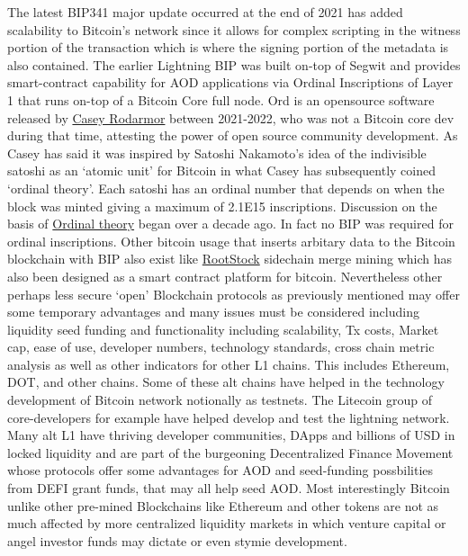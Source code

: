 \documentclass[final,5p,times,twocolumn,authoryear]{elsarticle}
\begin{document}
The latest BIP341 major update occurred at the end of 2021 has added scalability to Bitcoin's network since it allows for complex scripting in the witness portion of the transaction which is where the signing portion of the metadata is also contained. The earlier Lightning BIP was built on-top of Segwit and provides smart-contract capability for AOD applications via Ordinal Inscriptions of Layer 1 that runs on-top of a Bitcoin Core full node. Ord is an opensource software released by \href{https://github.com/casey/ord}{Casey Rodarmor} between 2021-2022, who was not a Bitcoin core dev during that time, attesting the power of open source community development. As Casey has said it was inspired by Satoshi Nakamoto's idea of the indivisible satoshi as an `atomic unit' for Bitcoin in what Casey has subsequently coined `ordinal theory'. Each satoshi has an ordinal number that depends on when the block was minted giving a maximum of 2.1E15 inscriptions. Discussion on the basis of \href{https://bitcointalk.org/index.php?topic=117224.0}{Ordinal theory} began over a decade ago. In fact no BIP was required for ordinal inscriptions. Other bitcoin usage that inserts arbitary data to the Bitcoin blockchain with BIP also exist like \href{https://dev.rootstock.io/rsk/}{RootStock} sidechain merge mining which has also been designed as a smart contract platform for bitcoin. Nevertheless other perhaps less secure `open' Blockchain protocols as previously mentioned may offer some temporary advantages and many issues must be considered including liquidity seed funding and functionality including scalability, Tx costs, Market cap, ease of use, developer numbers, technology standards, cross chain metric analysis as well as other indicators for other L1 chains. This includes Ethereum, DOT, and other chains. Some of these alt chains have helped in the technology development of Bitcoin network notionally as testnets. The Litecoin group of core-developers for example have helped develop and test the lightning network. Many alt L1 have thriving developer communities, DApps and billions of USD in locked liquidity and are part of the burgeoning Decentralized Finance Movement whose protocols offer some advantages for AOD and seed-funding possbilities from DEFI grant funds, that may all help seed AOD. Most interestingly Bitcoin unlike other pre-mined Blockchains like Ethereum and other tokens are not as much affected by more centralized liquidity markets in which venture capital or angel investor funds may dictate or even stymie development. 
\end{document}
